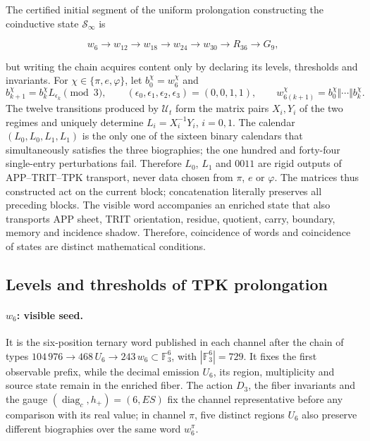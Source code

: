 The certified initial segment of the uniform prolongation constructing the
coinductive state \(\mathcal S_\infty\) is

\[
w_6\longrightarrow w_{12}\longrightarrow w_{18}\longrightarrow w_{24}
\longrightarrow w_{30}\longrightarrow R_{36}\longrightarrow G_9,
\]

but writing the chain acquires content only by declaring its
levels, thresholds and invariants. For
\(\chi\in\{\pi,e,\varphi\}\), let \(b_0^\chi=w_6^\chi\) and
\[
 b_{k+1}^\chi=b_k^\chi L_{\epsilon_k}\pmod 3,
 \qquad
 (\epsilon_0,\epsilon_1,\epsilon_2,\epsilon_3)=(0,0,1,1),
 \qquad
 w_{6(k+1)}^\chi=b_0^\chi\Vert\cdots\Vert b_k^\chi.
\]
The twelve transitions produced by \(\mathcal U_t\) form the matrix
pairs \(X_i,Y_i\) of the two regimes and uniquely determine
\(L_i=X_i^{-1}Y_i\), \(i=0,1\). The calendar
\((L_0,L_0,L_1,L_1)\) is the only one of the sixteen binary calendars that
simultaneously satisfies the three biographies; the one hundred and forty-four
single-entry perturbations fail. Therefore \(L_0\), \(L_1\) and
\(0011\) are rigid outputs of APP--TRIT--TPK transport, never data
chosen from \(\pi\), \(e\) or \(\varphi\). The matrices thus
constructed act on the current block; concatenation literally preserves
all preceding blocks. The visible word accompanies an enriched state that also transports
APP sheet, TRIT orientation, residue, quotient, carry, boundary,
memory and incidence shadow. Therefore, coincidence of words and
coincidence of states are distinct mathematical conditions.

\subsection*{Levels and thresholds of TPK prolongation}
\label{sec:umbrales-prolongacion-tpk-inaugural}

\paragraph{\(w_6\): visible seed.}
It is the six-position ternary word published in each channel after
the chain of types
\(104\,976\to468\,U_6\to243\,w_6\subset\mathbb F_3^6\), with
\(|\mathbb F_3^6|=729\).
It fixes the first observable prefix, while the decimal emission \(U_6\), its
region, multiplicity and source state remain in the enriched
fiber. The action \(D_3\), the fiber invariants and the gauge
\((\operatorname{diag}_c,h_+)=(6,ES)\) fix the channel representative before
any comparison with its real value; in channel \(\pi\), five
distinct regions \(U_6\) also preserve different biographies over the
same word \(w_6^\pi\).

